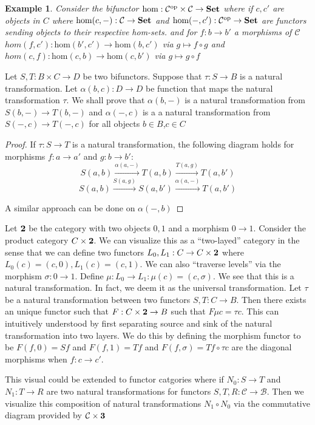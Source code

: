 \documentclass[12pt]{article}
\newtheorem{example}{Example}[section]
\begin{document}
\begin{example}
 Consider the bifunctor $\text{hom}: \mathcal{C^{\text{op}}} \times \mathcal{C} \rightarrow {\bf Set}$ where if $c,c'$ are objects in $C$ where $\text{hom}(c,-): \mathcal{C} \rightarrow {\bf Set}$ and $\text{hom}(-,c'): \mathcal{C^{\text{op}}} \rightarrow {\bf Set}$ are functors sending objects to their respective hom-sets. and for $f:
b \rightarrow b'$ a morphisms of $\mathcal{C}$ $hom(f,c'): \text{hom}(b',c') \rightarrow \text{hom}(b,c')$ via $g \mapsto f \circ g$ and $hom(c,f): \text{hom}(c,b) \rightarrow \text{hom}(c,b')$ via $g \mapsto g \circ f$
\end{example}

Let $S,T:B \times C \rightarrow D$ be two bifunctors. Suppose that $\tau: S \rightarrow B$ is a natural transformation. Let $\alpha(b,c): D \rightarrow D$ be function that maps the natural transformation $\tau$.  We shall prove that $\alpha(b,-)$ is a natural transformation from $S(b,-) \rightarrow T(b,-)$ and $\alpha(-,c)$ is a a natural transformation from $S(-,c) \rightarrow T(-,c)$ for all objects $b \in B$,$c \in C$
\begin{proof}
 If $\tau: S \rightarrow T$ is a natural transformation, the following diagram holds for morphisms $f:a \rightarrow a'$ and $g:b \rightarrow b'$:
 $$  S(a,b) \xrightarrow{\alpha(a,-)} T(a,b) \xrightarrow{T(a,g)} T(a,b') $$
 $$  S(a,b) \xrightarrow{S(a,g)} S(a,b') \xrightarrow{\alpha(a,-)} T(a,b') $$
 
 A similar approach can be done on $\alpha(-,b)$ 
\end{proof}

Let ${\bf 2}$ be the category with two objects $0,1$ and a morphism $0 \rightarrow 1$. Consider the product category $C \times {\bf 2}$. We can visualize this as a ``two-layed'' category in the sense that we can define two functors $L_0,L_1: C \rightarrow C \times {\bf 2}$ where $L_0(c) = (c,0), L_1(c) = (c,1)$. We can also ``traverse levels'' via the morphism $\sigma: 0 \rightarrow 1$. Define $\mu: L_0 \rightarrow L_1:
\mu(c) = (c,\sigma)$. We see that this is a natural transformation. In fact, we deem it as the universal transformation. Let $\tau$ be a natural transformation between two functors $S,T: C \rightarrow B$. Then there exists an unique functor such that $F: C \times {\bf 2} \rightarrow B$ such that $F\mu c = \tau c$. This can intuitively understood by first separating source and sink of the natural transformation into two layers. We do this by defining the morphism functor to be $F(f,0) = Sf$ and $F(f,1) = Tf$ and $F(f,\sigma) = Tf \circ \tau c$ are the diagonal morphisms when $f: c \rightarrow c'$.

This visual could be extended to functor catgories where if $N_0: S \rightarrow T$ and $N_1: T \rightarrow R$ are two natural transformations for functors $S,T,R: \mathcal{C} \rightarrow \mathcal{B}$. Then we visualize this composition of natural transformations $N_1 \circ N_0$ via the commutative diagram provided by $\mathcal{C} \times {\bf 3}$ 
\end{document}
